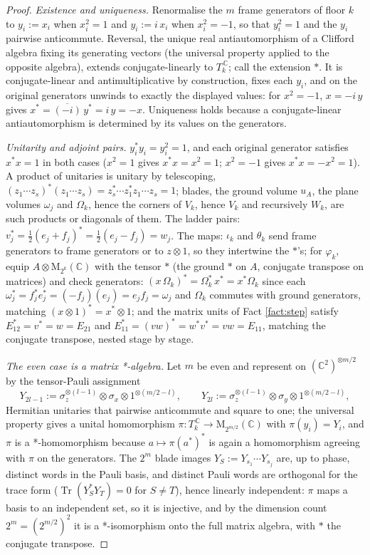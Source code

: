\documentclass[11pt]{article}
\theoremstyle{definition}
\newcommand{\C}{\mathbb{C}}
\newcommand{\Mat}{\mathrm{M}}
\begin{document}
\begin{proof}
\emph{Existence and uniqueness.} Renormalise the $m$ frame generators of floor $k$ to $y_i := x_i$ when $x_i^2 = 1$ and $y_i := i\,x_i$ when $x_i^2 = -1$, so that $y_i^2 = 1$ and the $y_i$ pairwise anticommute. Reversal, the unique real antiautomorphism of a Clifford algebra fixing its generating vectors (the universal property applied to the opposite algebra), extends conjugate-linearly to $T_k^{\,\C}$; call the extension $*$. It is conjugate-linear and antimultiplicative by construction, fixes each $y_i$, and on the original generators unwinds to exactly the displayed values: for $x^2 = -1$, $x = -i\,y$ gives $x^* = \overline{(-i)}\, y^* = i\,y = -x$. Uniqueness holds because a conjugate-linear antiautomorphism is determined by its values on the generators.

\emph{Unitarity and adjoint pairs.} $y_i^* y_i = y_i^2 = 1$, and each original generator satisfies $x^* x = 1$ in both cases ($x^2 = 1$ gives $x^*x = x^2 = 1$; $x^2 = -1$ gives $x^*x = -x^2 = 1$). A product of unitaries is unitary by telescoping, $(z_1 \cdots z_s)^* (z_1 \cdots z_s) = z_s^* \cdots z_1^* z_1 \cdots z_s = 1$; blades, the ground volume $u_A$, the plane volumes $\omega_j$ and $\Omega_k$, hence the corners of $V_k$, hence $V_k$ and recursively $W_k$, are such products or diagonals of them. The ladder pairs: $v_j^* = \tfrac12(e_j + f_j)^* = \tfrac12(e_j - f_j) = w_j$. The maps: $\iota_k$ and $\theta_k$ send frame generators to frame generators or to $z \otimes 1$, so they intertwine the $*$'s; for $\varphi_k$, equip $A \otimes \Mat_{2^k}(\C)$ with the tensor $*$ (the ground $*$ on $A$, conjugate transpose on matrices) and check generators: $(x\,\Omega_k)^* = \Omega_k^*\, x^* = x^* \Omega_k$ since each $\omega_j^* = f_j^* e_j^* = (-f_j)(e_j) = e_j f_j = \omega_j$ and $\Omega_k$ commutes with ground generators, matching $(x \otimes 1)^* = x^* \otimes 1$; and the matrix units of Fact \ref{fact:step} satisfy $E_{12}^* = v^* = w = E_{21}$ and $E_{11}^* = (vw)^* = w^* v^* = vw = E_{11}$, matching the conjugate transpose, nested stage by stage.

\emph{The even case is a matrix *-algebra.} Let $m$ be even and represent on $(\C^2)^{\otimes m/2}$ by the tensor-Pauli assignment
\[
Y_{2l-1} := \sigma_z^{\otimes (l-1)} \otimes \sigma_x \otimes 1^{\otimes (m/2 - l)}, \qquad
Y_{2l} := \sigma_z^{\otimes (l-1)} \otimes \sigma_y \otimes 1^{\otimes (m/2 - l)} ,
\]
Hermitian unitaries that pairwise anticommute and square to one; the universal property gives a unital homomorphism $\pi : T_k^{\,\C} \to \Mat_{2^{m/2}}(\C)$ with $\pi(y_i) = Y_i$, and $\pi$ is a *-homomorphism because $a \mapsto \pi(a^*)^*$ is again a homomorphism agreeing with $\pi$ on the generators. The $2^m$ blade images $Y_S := Y_{s_1} \cdots Y_{s_j}$ are, up to phase, distinct words in the Pauli basis, and distinct Pauli words are orthogonal for the trace form ($\operatorname{Tr}(Y_S^* Y_T) = 0$ for $S \neq T$), hence linearly independent: $\pi$ maps a basis to an independent set, so it is injective, and by the dimension count $2^m = (2^{m/2})^2$ it is a *-isomorphism onto the full matrix algebra, with $*$ the conjugate transpose.


\end{proof}
\end{document}
